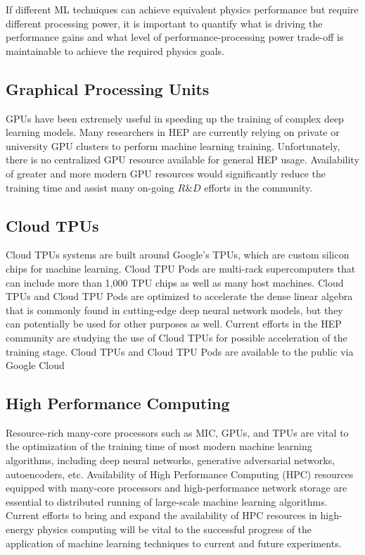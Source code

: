 If different ML techniques can achieve equivalent physics performance but require different processing power, it is important to quantify what is driving the performance gains and what level of performance-processing power trade-off is maintainable to achieve the required physics goals.

\subsection{Graphical Processing Units}\label{subsec:GPU}

GPUs have been extremely useful in speeding up the training of complex deep learning models. Many researchers in HEP are currently relying on private or university GPU clusters to perform machine learning training. Unfortunately, there is no centralized GPU resource available for general HEP usage. Availability of greater and more modern GPU resources would significantly reduce the training time and assist many on-going $R\&D$ efforts in the community.

\subsection{Cloud TPUs}\label{subsec:TPU}

Cloud TPUs systems are built around Google's TPUs, which are custom silicon chips for machine learning.
Cloud TPU Pods are multi-rack supercomputers that can include more than 1,000 TPU chips as well as many host machines.
Cloud TPUs and Cloud TPU Pods are optimized to accelerate the dense linear algebra that is commonly found in cutting-edge deep neural network models, but they can potentially be used for other purposes as well.
Current efforts in the HEP community are studying the use of Cloud TPUs for possible acceleration of the training stage.
Cloud TPUs and Cloud TPU Pods are available to the public via Google Cloud ~\cite{cloudgoogle}

\subsection{High Performance Computing}

Resource-rich many-core processors such as MIC, GPUs, and TPUs are vital to the optimization of the training time of most modern machine learning algorithms, including deep neural networks, generative adversarial networks, autoencoders, etc. Availability of High Performance Computing (HPC) resources equipped with many-core processors and high-performance network storage are essential to distributed running of large-scale machine learning algorithms. Current efforts to bring and expand the availability of HPC resources in high-energy physics computing will be vital to the successful progress of the application of machine learning techniques to current and future experiments.

